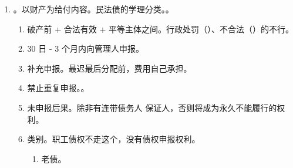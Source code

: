 \begin{enumerate}
\begin{enumerate}
\begin{enumerate}
                        \begin{enumerate}
                          \item 次债务人（债务人的债务人）。
                                \begin{itemize}
                                  \item 受理后取得他人对债务人的债权。。
                                  \item （为了抵销）突击取得债权。。
                                \end{itemize}
                          \item 突击负债。明知债务人有不能清偿的债务 \hz 破产，仍对债务人负担债务。
                                。
                                \begin{itemize}
                                  \item 例外。因[法律规定 \hz 破产申请 1 年前]发生的债务。。
                                \end{itemize}
                        \end{enumerate}
                  \item 禁止股东抵销。顺序、种类、性质不一样。
                \end{enumerate}
          \item {}。以财产为给付内容。民法债的学理分类。。
                \begin{enumerate}
                  \item 破产前 + 合法有效 + 平等主体之间。行政处罚（）、不合法（）的不行。
                  \item 30 日 - 3 个月内向管理人申报。
                  \item 补充申报。最迟最后分配前，费用自己承担。
                  \item 禁止重复申报。。
                  \item 未申报后果。除非有连带债务人 \hz 保证人，否则将成为永久不能履行的权利。
                  \item 类别。职工债权不走这个，没有债权申报权利。
                        \begin{enumerate}
                          \item 老债。

\end{enumerate}
\end{enumerate}
\end{enumerate}
\end{enumerate}
